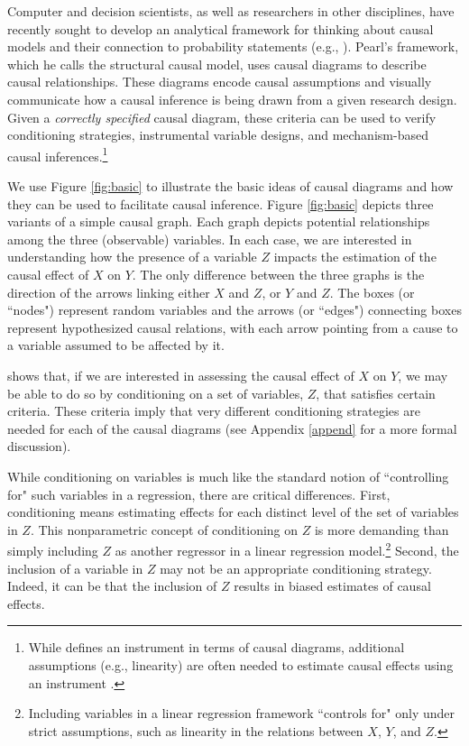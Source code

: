 \documentclass[12pt,reqno,titlepage]{amsart}
\theoremstyle{definition}
\begin{document}
\begin{doublespace}
Computer and decision scientists, as well as researchers in other disciplines, have recently sought to develop an analytical framework for thinking about causal models and their connection to probability statements (e.g., \citet{ Pearl:2009kh}).
Pearl's framework, which he calls the structural causal model, uses causal diagrams to describe causal relationships. 
These diagrams encode causal assumptions and visually communicate how a causal inference is being drawn from a given research design.
Given a \emph{correctly specified} causal diagram, these criteria can be used to verify conditioning strategies, instrumental variable designs, and mechanism-based causal inferences.\footnote{While \citet[p.248]{Pearl:2009kh} defines an instrument in terms of causal diagrams, additional assumptions (e.g., linearity) are often needed to estimate causal effects using an instrument \citep{Angrist:1996p7456}.}

We use Figure \ref{fig:basic} to illustrate the basic ideas of causal diagrams and how they can be used to facilitate causal inference.
Figure \ref{fig:basic} depicts three variants of a simple causal graph.
Each graph depicts potential relationships among the three (observable) variables.
In each case, we are interested in understanding how the presence of a variable $Z$ impacts the estimation of the causal effect of $X$ on $Y$.
The only difference between the three graphs is the direction of the arrows linking either $X$ and $Z$, or $Y$ and $Z$.
The boxes (or ``nodes") represent random variables and the arrows (or ``edges") connecting boxes represent hypothesized causal relations, with each arrow pointing from a cause to a variable assumed to be affected by it.

\citet{Pearl:2009vo} shows that, if we are interested in assessing the causal effect of $X$ on $Y$, we may be able to do so by conditioning on a set of variables, $Z$, that satisfies certain criteria.
These criteria imply that very different conditioning strategies are needed for each of the causal diagrams (see Appendix \ref{append} for a more formal discussion).

While conditioning on variables is much like the standard notion of ``controlling for" such variables in a regression, there are critical differences.
First, conditioning means estimating effects for each distinct level of the set of variables in $Z$. 
This nonparametric concept of conditioning on $Z$ is more demanding than simply including $Z$ as another regressor in a linear regression model.\footnote{Including variables in a linear regression framework ``controls for" only under strict assumptions, such as linearity in the relations between $X$, $Y$, and $Z$.}
Second, the inclusion of a variable in $Z$ may not be an appropriate conditioning strategy. 
Indeed, it can be that the inclusion of $Z$ results in biased estimates of causal effects.


\end{doublespace}
\end{document}
